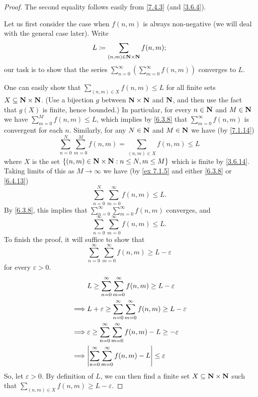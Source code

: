 \begin{proof}
  The second equality follows easily from \cref{7.4.3} (and \cref{3.6.4}).

  Let us first consider the case when \(f(n, m)\) is always non-negative (we will deal with the general case later).
  Write
  \[
    L \coloneqq \sum_{(n, m) \in \mathbf{N} \times \mathbf{N}} f(n, m);
  \]
  our task is to show that the series \(\sum_{n = 0}^\infty (\sum_{m = 0}^\infty f(n, m))\) converges to \(L\).

  One can easily show that \(\sum_{(n, m) \in X} f(n, m) \leq L\) for all finite sets \(X \subseteq \mathbf{N} \times \mathbf{N}\).
  (Use a bijection \(g\) between \(\mathbf{N} \times \mathbf{N}\) and \(\mathbf{N}\), and then use the fact that \(g(X)\) is finite, hence bounded.)
  In particular, for every \(n \in \mathbf{N}\) and \(M \in \mathbf{N}\) we have \(\sum_{m = 0}^M f(n, m) \leq L\), which implies by \cref{6.3.8} that \(\sum_{m = 0}^\infty f(n, m)\) is convergent for each \(n\).
  Similarly, for any \(N \in \mathbf{N}\) and \(M \in \mathbf{N}\) we have (by \cref{7.1.14})
  \[
    \sum_{n = 0}^N \sum_{m = 0}^M f(n, m) = \sum_{(n, m) \in X} f(n, m) \leq L
  \]
  where \(X\) is the set \(\{(n,m) \in \mathbf{N} \times \mathbf{N} : n \leq N, m \leq M\}\) which is finite by \cref{3.6.14}.
  Taking limits of this as \(M \to \infty\) we have (by \cref{ex 7.1.5} and either \cref{6.3.8} or \cref{6.4.13})
  \[
    \sum_{n = 0}^N \sum_{m = 0}^\infty f(n, m) \leq L.
  \]
  By \cref{6.3.8}, this implies that \(\sum_{n = 0}^\infty \sum_{m = 0}^\infty f(n, m)\) converges, and
  \[
    \sum_{n = 0}^\infty \sum_{m = 0}^\infty f(n, m) \leq L.
  \]
  To finish the proof, it will suffice to show that
  \[
    \sum_{n = 0}^\infty \sum_{m = 0}^\infty f(n, m) \geq L - \varepsilon
  \]
  for every \(\varepsilon > 0\).
  \begin{align*}
             & L \geq \sum_{n = 0}^\infty \sum_{m = 0}^\infty f(n, m) \geq L - \varepsilon               \\
    \implies & L + \varepsilon \geq \sum_{n = 0}^\infty \sum_{m = 0}^\infty f(n, m) \geq L - \varepsilon \\
    \implies & \varepsilon \geq \sum_{n = 0}^\infty \sum_{m = 0}^\infty f(n, m) - L \geq -\varepsilon    \\
    \implies & \abs{\sum_{n = 0}^\infty \sum_{m = 0}^\infty f(n, m) - L} \leq \varepsilon                \\
  \end{align*}
  So, let \(\varepsilon > 0\).
  By definition of \(L\), we can then find a finite set \(X \subseteq \mathbf{N} \times \mathbf{N}\) such that \(\sum_{(n, m) \in X} f(n, m) \geq L - \varepsilon\).

\end{proof}
